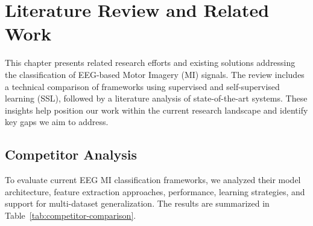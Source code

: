 \chapter{Literature Review and Related Work}
\label{chap:relatedworks}

This chapter presents related research efforts and existing solutions addressing the classification of EEG-based Motor Imagery (MI) signals. The review includes a technical comparison of frameworks using supervised and self-supervised learning (SSL), followed by a literature analysis of state-of-the-art systems. These insights help position our work within the current research landscape and identify key gaps we aim to address.

\section{Competitor Analysis}
\label{section:competitor-analysis}

To evaluate current EEG MI classification frameworks, we analyzed their model architecture, feature extraction approaches, performance, learning strategies, and support for multi-dataset generalization. The results are summarized in Table~\ref{tab:competitor-comparison}.

